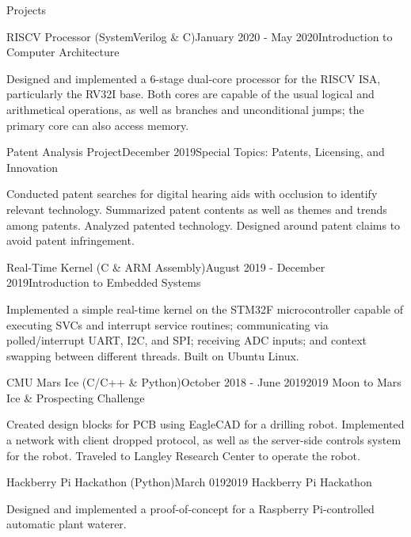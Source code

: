 \documentclass{resume} %
\begin{document}
\begin{Section}{Projects}

\begin{Subsection}{RISCV Processor (SystemVerilog \& C)}{January 2020 - May 2020}{Introduction to Computer Architecture}
\item Designed and implemented a 6-stage dual-core processor for the RISCV ISA, particularly the RV32I base. Both cores are capable of the usual logical and arithmetical operations, as well as branches and unconditional jumps; the primary core can also access memory.
\end{Subsection}

\begin{Subsection}{Patent Analysis Project}{December 2019}{Special Topics: Patents, Licensing, and Innovation}
\item Conducted patent searches for digital hearing aids with occlusion to identify relevant technology. Summarized patent contents as well as themes and trends among patents. Analyzed patented technology. Designed around patent claims to avoid patent infringement.
\end{Subsection}

\begin{Subsection}{Real-Time Kernel (C \& ARM Assembly)}{August 2019 - December 2019}{Introduction to Embedded Systems}
\item Implemented a simple real-time kernel on the STM32F microcontroller capable of executing SVCs and interrupt service routines; communicating via polled/interrupt UART, I2C, and SPI; receiving ADC inputs; and context swapping between different threads. Built on Ubuntu Linux.
\end{Subsection}

\begin{Subsection}{CMU Mars Ice (C/C++ \& Python)}{October 2018 - June 2019}{2019 Moon to Mars Ice \& Prospecting Challenge}
\item Created design blocks for PCB using EagleCAD for a drilling robot. Implemented a network with client dropped protocol, as well as the server-side controls system for the robot. Traveled to Langley Research Center to operate the robot.
\end{Subsection}

\begin{Subsection}{Hackberry Pi Hackathon (Python)}{March 019}{2019 Hackberry Pi Hackathon}
\item Designed and implemented a proof-of-concept for a Raspberry Pi-controlled automatic plant waterer.
\end{Subsection}


\end{Section}
\end{document}
